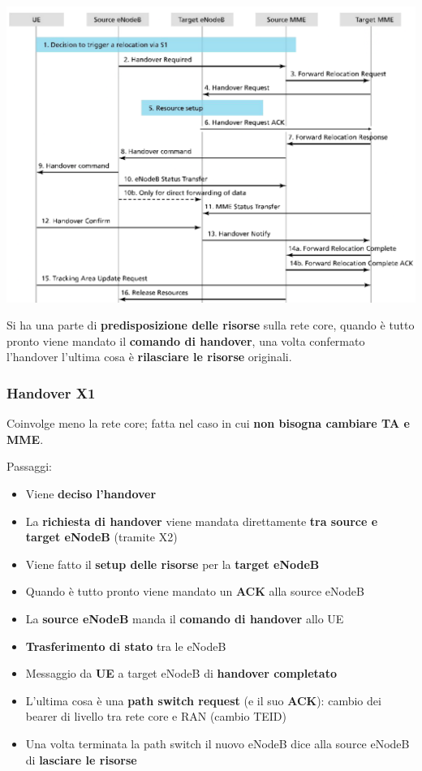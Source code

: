 \begin{center}
	\includegraphics[width=0.98\linewidth]{img/4g/hand1}
\end{center}

Si ha una parte di \textbf{predisposizione delle risorse} sulla rete core, quando è tutto pronto viene mandato il \textbf{comando di handover}, una volta confermato l'handover l'ultima cosa è \textbf{rilasciare le risorse} originali.\\

\subsubsection{Handover X1}

Coinvolge meno la rete core; fatta nel caso in cui \textbf{non bisogna cambiare TA e MME}. \\

\newpage

Passaggi: 
\begin{itemize}
	\item Viene \textbf{deciso l'handover}
	\item La \textbf{richiesta di handover} viene mandata direttamente \textbf{tra source e target eNodeB} (tramite X2)
	\item Viene fatto il \textbf{setup delle risorse} per la \textbf{target eNodeB}
	\item Quando è tutto pronto viene mandato un \textbf{ACK} alla source eNodeB
	\item La \textbf{source eNodeB} manda il \textbf{comando di handover} allo UE
	\item \textbf{Trasferimento di stato} tra le eNodeB
	\item Messaggio da \textbf{UE} a target eNodeB di \textbf{handover completato}
	\item L'ultima cosa è una \textbf{path switch request} (e il suo \textbf{ACK}): cambio dei bearer di livello tra rete core e RAN (cambio TEID)
	\item Una volta terminata la path switch il nuovo eNodeB dice alla source eNodeB di \textbf{lasciare le risorse}
\end{itemize}

